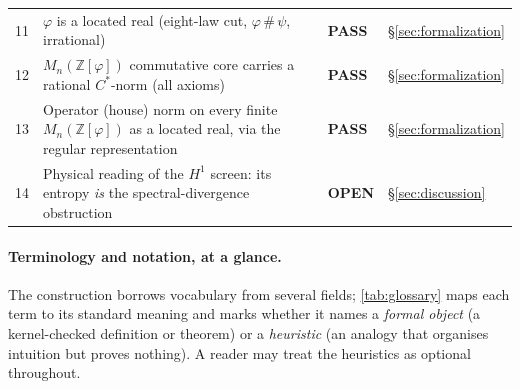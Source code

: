 \documentclass[11pt,letterpaper]{article}
\theoremstyle{plain}
\theoremstyle{definition}
\theoremstyle{remark}
\newcommand{\ZZ}{\mathbb{Z}}
\newcommand{\Zphi}{\ZZ[\varphi]}
\begin{document}
\begin{table}[t]
\begin{tabular}{@{}c>{\raggedright\arraybackslash}p{8.3cm}l>{\raggedright\arraybackslash}p{2.5cm}@{}}
11 & $\varphi$ is a located real (eight-law cut, $\varphi\,\#\,\psi$, irrational) & \textcolor{okGreen}{\textbf{PASS}} & \S\ref{sec:formalization} \\
12 & $M_n(\Zphi)$ commutative core carries a rational $C^\ast$-norm (all axioms) & \textcolor{okGreen}{\textbf{PASS}} & \S\ref{sec:formalization} \\
13 & Operator (house) norm on every finite $M_n(\Zphi)$ as a located real, via the regular representation & \textcolor{okGreen}{\textbf{PASS}} & \S\ref{sec:formalization} \\
\midrule
14 & Physical reading of the $H^1$ screen: its entropy \emph{is} the spectral-divergence obstruction & \textcolor{okVerm}{\textbf{OPEN}} & \S\ref{sec:discussion} \\
\bottomrule
\end{tabular}
\end{table}

\paragraph{Terminology and notation, at a glance.}
The construction borrows vocabulary from several fields; \cref{tab:glossary} maps each term
to its standard meaning and marks whether it names a \emph{formal object} (a kernel-checked
definition or theorem) or a \emph{heuristic} (an analogy that organises intuition but
proves nothing). A reader may treat the heuristics as optional throughout.
\end{document}
